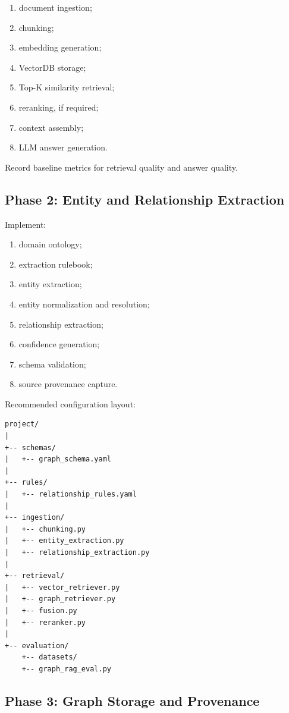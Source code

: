 \documentclass[11pt,a4paper]{article}
\begin{document}
\begin{enumerate}
\item document ingestion;
\item chunking;
\item embedding generation;
\item VectorDB storage;
\item Top-K similarity retrieval;
\item reranking, if required;
\item context assembly;
\item LLM answer generation.
\end{enumerate}

Record baseline metrics for retrieval quality and answer quality.

\subsection{Phase 2: Entity and Relationship Extraction}

Implement:

\begin{enumerate}
\item domain ontology;
\item extraction rulebook;
\item entity extraction;
\item entity normalization and resolution;
\item relationship extraction;
\item confidence generation;
\item schema validation;
\item source provenance capture.
\end{enumerate}

Recommended configuration layout:

\begin{lstlisting}
project/
|
+-- schemas/
|   +-- graph_schema.yaml
|
+-- rules/
|   +-- relationship_rules.yaml
|
+-- ingestion/
|   +-- chunking.py
|   +-- entity_extraction.py
|   +-- relationship_extraction.py
|
+-- retrieval/
|   +-- vector_retriever.py
|   +-- graph_retriever.py
|   +-- fusion.py
|   +-- reranker.py
|
+-- evaluation/
    +-- datasets/
    +-- graph_rag_eval.py
\end{lstlisting}

\subsection{Phase 3: Graph Storage and Provenance}
\end{document}
